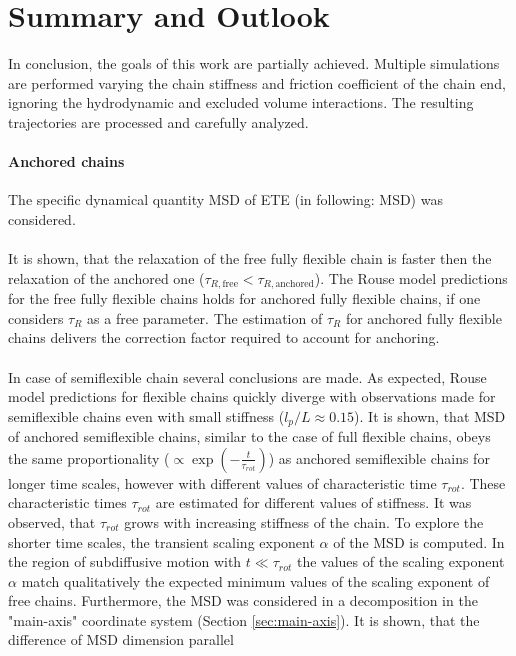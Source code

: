\documentclass[
    paper=A4,pagesize=automedia,fontsize=12pt,
    BCOR=15mm,DIV=22,
    twoside,headinclude,footinclude=false,
    fleqn,             %
    bibliography=totocnumbered,          %
    listof=totoc,                %
    listof=flat,                 %
    cleardoublepage=empty      %
    numbers=endperiod
]{scrartcl}
\begin{document}
\section{Summary and Outlook}
In conclusion, the goals of this work are partially achieved. Multiple simulations 
are performed varying the chain stiffness and friction coefficient of the chain end, 
ignoring the hydrodynamic and excluded volume interactions. 
The resulting trajectories are processed and carefully analyzed. 

\paragraph{Anchored chains}
The specific dynamical quantity MSD of ETE (in following: MSD) was considered.
\\
\\
It is shown,
that the relaxation of the free fully flexible chain is faster then the relaxation of the
anchored one ($\tau_{R,\text{free}} < \tau_{R,\text{anchored}}$). The Rouse model predictions
for the free fully flexible chains holds for anchored fully flexible chains, if one considers
$\tau_R$ as a free parameter. The estimation of $\tau_R$ for anchored fully flexible chains 
delivers the correction factor required to account for anchoring.
\\
\\
In case of semiflexible chain several conclusions are made. As expected,
Rouse model predictions for flexible chains quickly diverge with observations made 
for semiflexible chains even with small stiffness ($l_p/L \approx 0.15$).
It is shown, that MSD of anchored semiflexible chains, 
similar to the case of full flexible chains, obeys the same 
proportionality ($\propto \exp\left(-\frac{t}{\tau_{rot}}\right)$) 
as anchored semiflexible chains for longer time scales, however with
different values of characteristic time $\tau_{rot}$. These characteristic times 
$\tau_{rot}$ are estimated for different values of stiffness. It was observed, that 
$\tau_{rot}$ grows with increasing stiffness of the chain. To explore the shorter time
scales, the transient scaling exponent $\alpha$ of the MSD is computed. 
In the region of subdiffusive 
motion with $t\ll\tau_{rot}$ the values of the scaling exponent $\alpha$ match
qualitatively the expected minimum values of the scaling exponent of free chains.
Furthermore, the MSD was considered in a decomposition in the "main-axis" coordinate 
system (Section \ref{sec:main-axis}). It is shown, that the difference of MSD dimension parallel
\end{document}
